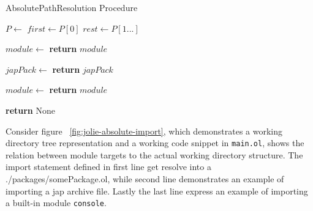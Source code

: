 \begin{algorithm}[h]
    \caption{AbsolutePathResolution Procedure}
    \label{algo:absolutePath}
    \begin{algorithmic}[1]


        \State $P\gets$  
        \State $first\gets P[0]$ 
        \State $rest\gets P[1...]$ 

        \State $module \gets$
        \State \textbf{return} $module$ 
        \EndIf

        \State $japPack \gets$
        \State \textbf{return} $japPack$
        \EndIf
        \EndIf

        \State $module \gets$
        \State \textbf{return} $module$ 
        \EndIf
        \EndFor

        \State \textbf{return} None 

        \EndProcedure

    \end{algorithmic}
\end{algorithm}

Consider figure ~\ref{fig:jolie-absolute-import}, which demonstrates a working directory tree representation and a working code snippet in \texttt{main.ol}, shows the relation between module targets to the actual working directory structure. The import statement defined in first line get resolve into a ./packages/somePackage.ol, while second line demonstrates an example of importing a jap archive file. Lastly the last line express an example of importing a built-in module \texttt{console}.

